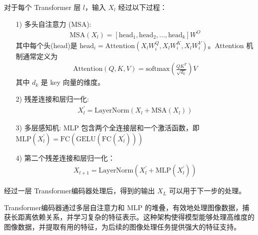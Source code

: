 \documentclass[a4paper]{ctexart}
\begin{document}
	对于每个 Transformer 层 $l$，输入 $X_l$ 经过以下过程：
	
	\begin{itemize}
		\item[1)] 
		多头自注意力 (MSA):
		\begin{equation}
			\begin{aligned}
				\text{MSA}(X_l) = [\text{head}_1, \text{head}_2, \ldots, \text{head}_k] W^{O}
			\end{aligned}
			\label{eq: MSA}
		\end{equation}
		其中每个头(head)是 $\text{head}_i = \text{Attention}\left(X_l W_i^Q, X_l W_i^K, X_l W_i^V \right)$。Attention 机制通常定义为
		\begin{equation}
			\begin{aligned}
				\text{Attention}(Q, K, V) = \text{softmax} \left(\frac{QK^T}{\sqrt{d_k}} \right) V
			\end{aligned}
			\label{eq: Attention}
		\end{equation}
		其中 $d_k$ 是 key 向量的维度。
		
		\item[2)]
		残差连接和层归一化:
		\begin{equation}
			\begin{aligned}
				X_l^\prime = \text{LayerNorm} \left(X_l + \text{MSA}(X_l)\right)
			\end{aligned}
			\label{eq: Residual Connection}
		\end{equation}
		
		\item[3)]
		多层感知机:
		MLP 包含两个全连接层和一个激活函数，即 $\text{MLP} (X_l^\prime) = \text{FC}\left(\text{GELU}\left(\text{FC}(X_l^\prime)\right)\right)$
		
		\item[4)]
		第二个残差连接和层归一化：
		\begin{equation}
			\begin{aligned}
				\displaystyle X_{l+1} = \text{LayerNorm} (X_l^\prime + \text{MLP}(X_l^\prime))
			\end{aligned}
			\label{eq: layernorm}
		\end{equation}
	\end{itemize}
	
	经过一层 Transformer编码器处理后，得到的输出 $X_L$ 可以用于下一步的处理。
	
	Transformer编码器通过多层自注意力和 MLP 的堆叠，有效地处理图像数据，捕获长距离依赖关系，并学习复杂的特征表示。这种架构使得模型能够处理高维度的图像数据，并提取有用的特征，为后续的图像处理任务提供强大的特征支持。
	
\end{document}

